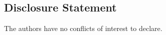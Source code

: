 \documentclass[]{hdsr}
\begin{document}
\subsection*{Disclosure Statement}
The authors have no conflicts of interest to declare.


 










\printbibliography
\end{document}
